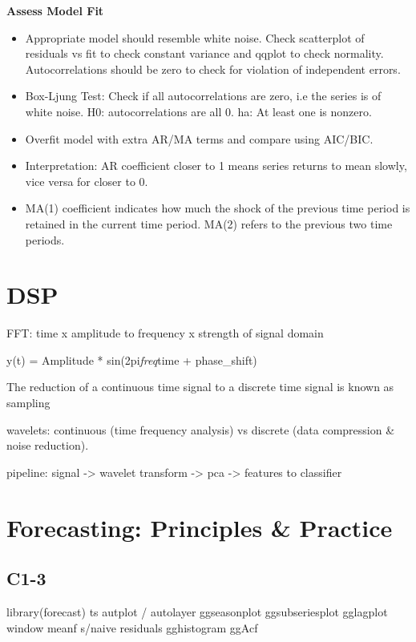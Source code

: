 \documentclass[]{book}
\begin{document}
\textbf{Assess Model Fit}

\begin{itemize}
\item
  Appropriate model should resemble white noise. Check scatterplot of
  residuals vs fit to check constant variance and qqplot to check
  normality. Autocorrelations should be zero to check for violation of
  independent errors.
\item
  Box-Ljung Test: Check if all autocorrelations are zero, i.e the series
  is of white noise. H0: autocorrelations are all 0. ha: At least one is
  nonzero.
\item
  Overfit model with extra AR/MA terms and compare using AIC/BIC.
\item
  Interpretation: AR coefficient closer to 1 means series returns to
  mean slowly, vice versa for closer to 0.
\item
  MA(1) coefficient indicates how much the shock of the previous time
  period is retained in the current time period. MA(2) refers to the
  previous two time periods.
\end{itemize}

\section{DSP}\label{dsp}

FFT: time x amplitude to frequency x strength of signal domain

y(t) = Amplitude * sin(2pi\emph{freq}time + phase\_shift)

The reduction of a continuous time signal to a discrete time signal is
known as sampling

wavelets: continuous (time frequency analysis) vs discrete (data
compression \& noise reduction).

pipeline: signal -\textgreater{} wavelet transform -\textgreater{} pca
-\textgreater{} features to classifier

\section{Forecasting: Principles \&
Practice}\label{forecasting-principles-practice}

\subsection{C1-3}\label{c1-3}

library(forecast) \textbar{} ts \textbar{} autplot / autolayer
\textbar{} ggseasonplot \textbar{} ggsubseriesplot \textbar{} gglagplot
\textbar{} window \textbar{} meanf \textbar{} s/naive \textbar{}
residuals \textbar{} gghistogram \textbar{} ggAcf \textbar{}
\end{document}
